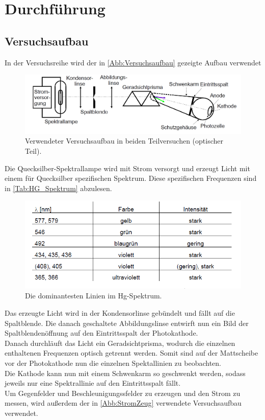 \section{Durchführung}
\label{sec:Durchführung}

\subsection{Versuchsaufbau}

In der Versuchsreihe wird der in \autoref{Abb:Versuchsaufbau} gezeigte Aufbau verwendet

\begin{figure}
    \centering
    \includegraphics[width=15cm]{Bilder/Versuchsaufbau.png}
    \caption{Verwendeter Versuchsaufbau in beiden Teilversuchen (optischer Teil).\cite{sample}}
    \label{Abb:Versuchsaufbau}
\end{figure}

Die Quecksilber-Spektrallampe wird mit Strom versorgt und erzeugt Licht mit einem für Quecksilber
spezifischen Spektrum. Diese spezifischen Frequenzen sind in \autoref{Tab:HG_Spektrum} abzulesen.

\begin{figure}
    \centering
    \includegraphics[width=15cm]{Bilder/Hg_Spektrum.png}
    \caption{Die dominantesten Linien im Hg-Spektrum.\cite{sample}}
    \label{Tab:HG_Spektrum}
\end{figure}

Das erzeugte Licht wird in der Kondensorlinse gebündelt und fällt auf die Spaltblende. 
Die danach geschaltete Abbildungslinse entwirft nun ein Bild der Spaltblendenöffnung
auf den Eintrittsspalt der Photokathode.\\
Danach durchläuft das Licht ein Geradsichtprisma, wodurch die einzelnen enthaltenen Frequenzen
optisch getrennt werden. Somit sind auf der Mattscheibe vor der Photokathode nun die einzelnen
Spektallinien zu beobachten.\\
Die Kathode kann nun mit einem Schwenkarm so geschwenkt werden, sodass jeweils nur eine 
Spektrallinie auf den Eintrittsspalt fällt.\\
Um Gegenfelder und Beschleunigungssfelder zu erzeugen und den Strom zu messen, wird außerdem
der in \autoref{Abb:StromZeug} verwendete Versuchsaufbau verwendet.

